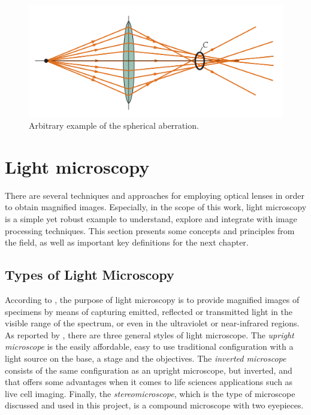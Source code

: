 \begin{figure}[htb]
	\centering
	\caption{\label{fig:spherical_aberrations} Arbitrary example of the spherical aberration.}
	\begin{center}
	    \includegraphics[scale=0.3]{images/spherical_aberration.png}
	\end{center}
	\centering
\end{figure}

\section{Light microscopy}
\label{sec:light_microscopy}

There are several techniques and approaches for employing optical lenses in order to obtain magnified images. Especially, in the scope of this work, light microscopy is a simple yet robust example to understand, explore and integrate with image processing techniques. This section presents some concepts and principles from the field, as well as important key definitions for the next chapter.

\subsection{Types of Light Microscopy}
According to , the purpose of light microscopy is to provide magnified images of specimens by means of capturing emitted, reflected or transmitted light in the visible range of the spectrum, or even in the ultraviolet or near-infrared regions. As reported by , there are three general styles of light microscope. The \emph{upright microscope} is the easily affordable, easy to use traditional configuration with a light source on the base, a stage and the objectives. The \emph{inverted microscope} consists of the same configuration as an upright microscope, but inverted, and that offers some advantages when it comes to life sciences applications such as live cell imaging. Finally, the \emph{stereomicroscope}, which is the type of microscope discussed and used in this project, is a compound microscope with two eyepieces.


